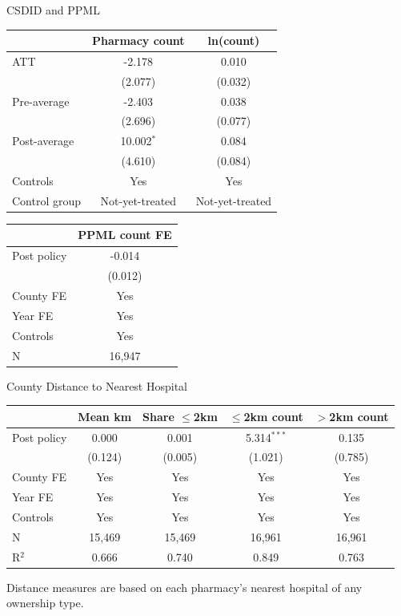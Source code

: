 \documentclass{beamer}
\begin{document}
\begin{frame}{ CSDID and PPML}

\centering
\scriptsize
\setlength{\tabcolsep}{7pt}

\begin{tabular}{lcc}
\toprule
& Pharmacy count & ln(count) \\
\midrule
ATT
& -2.178 & 0.010 \\
& (2.077) & (0.032) \\
\addlinespace
Pre-average
& -2.403 & 0.038 \\
& (2.696) & (0.077) \\
\addlinespace
Post-average
& 10.002$^{*}$ & 0.084 \\
& (4.610) & (0.084) \\
\midrule
Controls & Yes & Yes \\
Control group & Not-yet-treated & Not-yet-treated \\
\bottomrule
\end{tabular}

\vspace{1em}

\begin{tabular}{lc}
\toprule
& PPML count FE \\
\midrule
Post policy
& -0.014 \\
& (0.012) \\
\midrule
County FE & Yes \\
Year FE & Yes \\
Controls & Yes \\
N & 16,947 \\
\bottomrule
\end{tabular}

\end{frame}

\begin{frame}{County Distance to Nearest Hospital}

\centering
\scriptsize
\setlength{\tabcolsep}{7pt}

\begin{tabular}{lcccc}
\toprule
& Mean km & Share $\leq$2km & $\leq$2km count & $>$2km count \\
\midrule
Post policy
& 0.000 & 0.001 & 5.314$^{***}$ & 0.135 \\
& (0.124) & (0.005) & (1.021) & (0.785) \\
\midrule
County FE & Yes & Yes & Yes & Yes \\
Year FE & Yes & Yes & Yes & Yes \\
Controls & Yes & Yes & Yes & Yes \\
\midrule
N & 15,469 & 15,469 & 16,961 & 16,961 \\
R$^2$ & 0.666 & 0.740 & 0.849 & 0.763 \\
\bottomrule
\end{tabular}

\vspace{0.6em}
\raggedright
\tiny Distance measures are based on each pharmacy's nearest hospital of any ownership type.

\end{frame}
\end{document}
